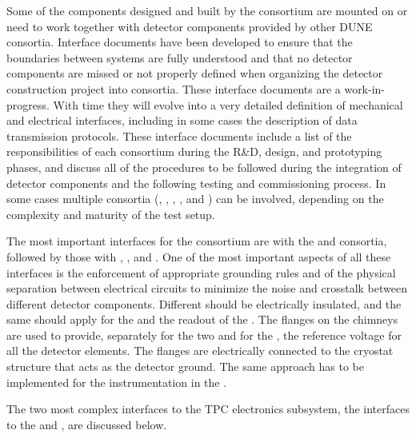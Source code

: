 Some of the components designed and built by the  consortium are
mounted on or need to work together with detector components provided by other DUNE
consortia. Interface documents have been developed to ensure that the boundaries
between systems are fully understood and that no detector components are missed or
not properly defined when organizing the detector construction project into
consortia. These interface documents are a work-in-progress. With time they will
evolve into a very detailed definition of mechanical and electrical interfaces,
including in some cases the description of data transmission protocols. These
interface documents include a list of the responsibilities of each consortium during the
R\&D, design, and prototyping phases, and discuss all of the procedures to be
followed during the integration of detector components and the following testing
and commissioning process. In some cases multiple consortia (, , , ,
and ) %
can be involved, depending on the complexity and maturity of the test setup.

The most important interfaces for the  consortium are with the  and 
consortia, followed by those with , , and . One of the most
important aspects of all these interfaces is the enforcement of appropriate grounding rules
and of the physical separation between electrical circuits to minimize the noise and
crosstalk between different detector components. Different  should be electrically
insulated, and the same should apply for the  and the
 readout of the . The flanges on the chimneys are used to provide,
separately for the two  and for the , the reference
voltage for all the detector elements. The flanges are electrically connected
to the cryostat structure that acts as the detector ground. The same approach
has to be implemented for the  instrumentation in the \lar.

The two most complex interfaces to the TPC electronics subsystem, the
interfaces to the  and , are discussed below.

